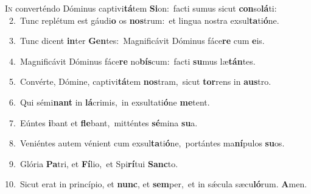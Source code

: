 \lettrine{\initial\textcolor{\initialcolor}{I}}{n} converténdo Dóminus captivi\-\textbf{tá}\-tem \textbf{Si}\-on:~\star facti sumus sicut \textbf{con}\-so\-\textbf{lá}\-ti:\\
{\numbfont\textcolor{\numbcolor}{~2.}}~Tunc replétum est gáudi\textbf{o} os \textbf{nos}\-trum:~\star et lingua nostra exsul\-\textbf{ta}\-ti\-\textbf{ó}\-ne.\par
{\numbfont\textcolor{\numbcolor}{~3.}}~Tunc dicent \textbf{in}\-ter \textbf{Gen}\-tes:~\star Magnificávit Dóminus fáce\textbf{re} cum \textbf{e}\-is.\par
{\numbfont\textcolor{\numbcolor}{~4.}}~Magnificávit Dóminus fáce\textbf{re} no\-\textbf{bís}\-cum:~\star facti \textbf{su}\-mus læ\-\textbf{tán}\-tes.\par
{\numbfont\textcolor{\numbcolor}{~5.}}~Convérte, Dómine, captivi\-\textbf{tá}\-tem \textbf{nos}\-tram,~\star sicut \textbf{tor}\-rens in \textbf{aus}\-tro.\par
{\numbfont\textcolor{\numbcolor}{~6.}}~Qui sémi\textbf{nant} in \textbf{lá}\-crimis,~\star in exsultati\-\textbf{ó}\-ne \textbf{me}\-tent.\par
{\numbfont\textcolor{\numbcolor}{~7.}}~Eúntes \textbf{i}\-bant et \textbf{fle}\-bant,~\star mitténtes \textbf{sé}\-mina \textbf{su}\-a.\par
{\numbfont\textcolor{\numbcolor}{~8.}}~Veniéntes autem vénient cum exsul\-\textbf{ta}\-ti\-\textbf{ó}\-ne,~\star portántes ma\-\textbf{ní}\-pulos \textbf{su}\-os.\par
{\numbfont\textcolor{\numbcolor}{~9.}}~Glória \textbf{Pa}\-tri, et \textbf{Fí}\-lio,~\star et Spi\-\textbf{rí}\-tui \textbf{Sanc}\-to.\par
{\numbfont\textcolor{\numbcolor}{10.}}~Sicut erat in princípio, et \textbf{nunc}\-, et \textbf{sem}\-per,~\star et in sǽcula sæcu\-\textbf{ló}\-rum. \textbf{A}\-men.\par
